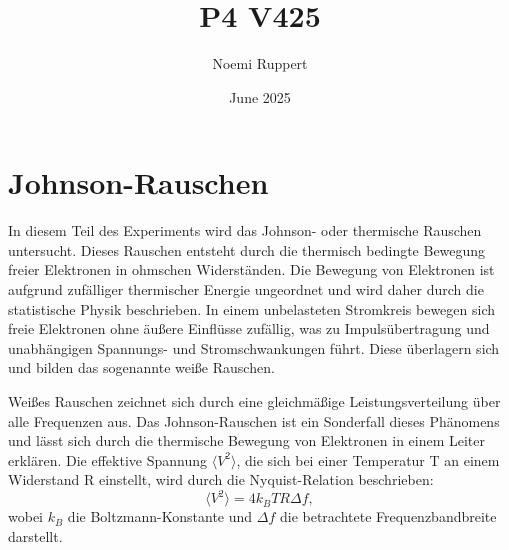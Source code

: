 \documentclass{article}
\title{P4 V425}
\author{Noemi Ruppert}
\date{June 2025}
\begin{document}
\maketitle

\chapter{Johnson-Rauschen}
In diesem Teil des Experiments wird das Johnson- oder thermische Rauschen untersucht. Dieses Rauschen entsteht durch die thermisch bedingte Bewegung freier Elektronen in ohmschen Widerständen. 
Die Bewegung von Elektronen ist aufgrund zufälliger thermischer Energie ungeordnet und wird daher durch die statistische Physik beschrieben. In einem unbelasteten Stromkreis bewegen sich freie Elektronen ohne äußere Einflüsse zufällig, was zu Impulsübertragung und unabhängigen Spannungs- und Stromschwankungen führt. Diese überlagern sich und bilden das sogenannte weiße Rauschen.

Weißes Rauschen zeichnet sich durch eine gleichmäßige Leistungsverteilung über alle Frequenzen aus.
Das Johnson-Rauschen ist ein Sonderfall dieses Phänomens und lässt sich durch die thermische Bewegung von Elektronen in einem Leiter erklären. Die effektive Spannung $\langle V^2 \rangle$, die sich bei einer Temperatur T an einem Widerstand R einstellt, wird durch die Nyquist-Relation \cite{Nyquist} beschrieben:
\begin{equation}
\langle V^2 \rangle = 4 k_B T R \Delta f,
\label{eq:nyquist}
\end{equation}
wobei $k_B$ die Boltzmann-Konstante und $\Delta f$ die betrachtete Frequenzbandbreite darstellt.
\end{document}
